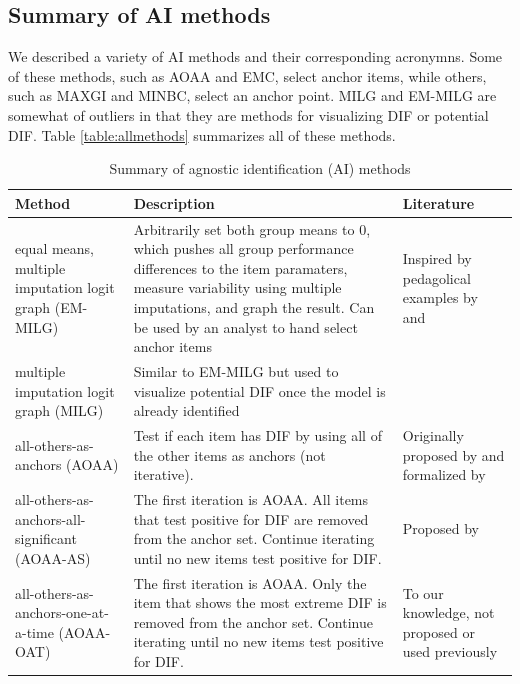 \documentclass[
  11pt,
]{article}
\begin{document}
\hypertarget{summary-of-ai-methods}{%
\subsection{Summary of AI methods}\label{summary-of-ai-methods}}

We described a variety of AI methods and their corresponding acronymns. Some of these methods, such as AOAA and EMC, select anchor items, while others, such as MAXGI and MINBC, select an anchor point. MILG and EM-MILG are somewhat of outliers in that they are methods for visualizing DIF or potential DIF. Table \ref{table:allmethods} summarizes all of these methods.

\begin{table}[H]
\caption{Summary of agnostic identification (AI) methods}
\centering
\begin{tabular}{|p{4cm}|p{6cm}|p{4cm}|}
\toprule

Method & Description & Literature \\

\midrule

equal means, multiple imputation logit graph (EM-MILG) & Arbitrarily set both group means to 0, which pushes all group performance differences to the item paramaters, measure variability using multiple imputations, and graph the result. Can be used by an analyst to hand select anchor items & Inspired by pedagolical examples by \cite{pohl2017cluster} and \cite{talbot2013taking} \\\hline

multiple imputation logit graph (MILG) & Similar to EM-MILG but used to visualize potential DIF once the model is already identified &  \\\hline

all-others-as-anchors (AOAA) & Test if each item has DIF by using all of the other items as anchors (not iterative). & Originally proposed by \cite{lord1980} and formalized by \cite{thissen1993detection} \\\hline

all-others-as-anchors-all-significant (AOAA-AS) & The first iteration is AOAA. All items that test positive for DIF are removed from the anchor set. Continue iterating until no new items test positive for DIF. & Proposed by \cite{drasgow1987study} \\\hline

all-others-as-anchors-one-at-a-time (AOAA-OAT) & The first iteration is AOAA. Only the item that shows the most extreme DIF is removed from the anchor set. Continue iterating until no new items test positive for DIF. & To our knowledge, not proposed or used previously \\\hline


\end{tabular}
\end{table}
\end{document}
